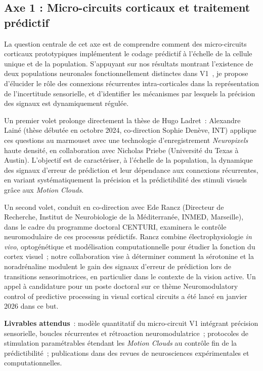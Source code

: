 \documentclass[10pt,french,a4paper]{article}%
\begin{document}
\subsection{Axe 1 : Micro-circuits corticaux et traitement prédictif}

La question centrale de cet axe est de comprendre comment des micro-circuits corticaux prototypiques implémentent le codage prédictif à l'échelle de la cellule unique et de la population. S'appuyant sur nos résultats montrant l'existence de deux populations neuronales fonctionnellement distinctes dans V1~\citep{Ladret23}, je propose d'élucider le rôle des connexions récurrentes intra-corticales dans la représentation de l'incertitude sensorielle, et d'identifier les mécanismes par lesquels la précision des signaux est dynamiquement régulée.

Un premier volet prolonge directement la thèse de Hugo Ladret~: Alexandre Lainé (thèse débutée en octobre 2024, co-direction Sophie Denève, INT) applique ces questions au marmouset avec une technologie d'enregistrement \emph{Neuropixels} haute densité, en collaboration avec Nicholas Priebe (Université du Texas à Austin). L'objectif est de caractériser, à l'échelle de la population, la dynamique des signaux d'erreur de prédiction et leur dépendance aux connexions récurrentes, en variant systématiquement la précision et la prédictibilité des stimuli visuels grâce aux \emph{Motion Clouds}.

Un second volet, conduit en co-direction avec Ede Rancz (Directeur de Recherche, Institut de Neurobiologie de la Méditerranée, INMED, Marseille), dans le cadre du programme doctoral CENTURI, examinera le contrôle neuromodulaire de ces processus prédictifs. Rancz combine électrophysiologie \emph{in vivo}, optogénétique et modélisation computationnelle pour étudier la fonction du cortex visuel~; notre collaboration vise à déterminer comment la sérotonine et la noradrénaline modulent le gain des signaux d'erreur de prédiction lors de transitions sensorimotrices, en particulier dans le contexte de la vision active. Un appel à candidature pour un poste doctoral sur ce thème \og{}Neuromodulatory control of predictive processing in visual cortical circuits\fg{} a été lancé en janvier 2026 dans ce but.

\textbf{Livrables attendus}~: modèle quantitatif du micro-circuit V1 intégrant précision sensorielle, boucles récurrentes et rétroaction neuromodulatrice~; protocoles de stimulation paramétrables étendant les \emph{Motion Clouds} au contrôle fin de la prédictibilité~; publications dans des revues de neurosciences expérimentales et computationnelles.
\end{document}
